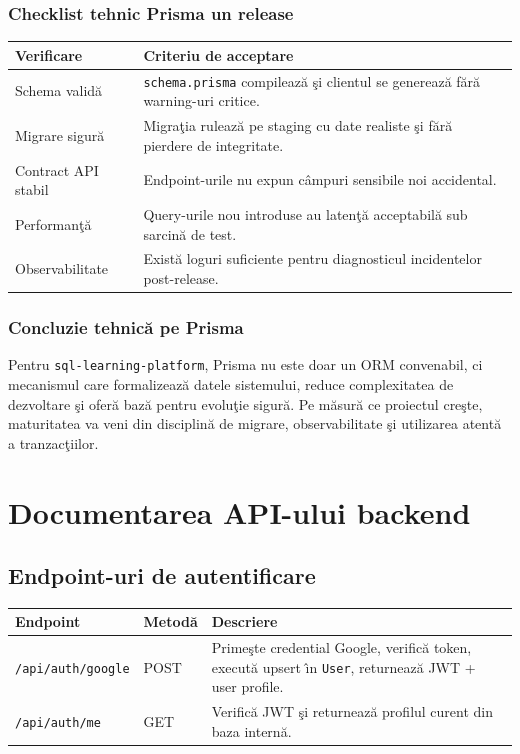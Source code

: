 \documentclass[12pt,onecolumn,draftclsnofoot]{IEEEtran}
\begin{document}
\subsubsection{Checklist tehnic Prisma un release}
\begin{longtable}{p{} p{}}
\toprule
\textbf{Verificare} & \textbf{Criteriu de acceptare} \\
\midrule
Schema valid\u{a} & \texttt{schema.prisma} compileaz\u{a} \c{s}i clientul se genereaz\u{a} f\u{a}r\u{a} warning-uri critice. \\
Migrare sigur\u{a} & Migra\c{t}ia ruleaz\u{a} pe staging cu date realiste \c{s}i f\u{a}r\u{a} pierdere de integritate. \\
Contract API stabil & Endpoint-urile nu expun c\^{a}mpuri sensibile noi accidental. \\
Performan\c{t}\u{a} & Query-urile nou introduse au laten\c{t}\u{a} acceptabil\u{a} sub sarcin\u{a} de test. \\
Observabilitate & Exist\u{a} loguri suficiente pentru diagnosticul incidentelor post-release. \\
\bottomrule
\end{longtable}

\subsubsection{Concluzie tehnic\u{a} pe Prisma}
Pentru \texttt{sql-learning-platform}, Prisma nu este doar un ORM convenabil, ci mecanismul care formalizeaz\u{a} datele sistemului, reduce complexitatea de dezvoltare \c{s}i ofer\u{a} baz\u{a} pentru evolu\c{t}ie sigur\u{a}. Pe m\u{a}sur\u{a} ce proiectul cre\c{s}te, maturitatea va veni din disciplin\u{a} de migrare, observabilitate \c{s}i utilizarea atent\u{a} a tranzac\c{t}iilor.

\section{Documentarea API-ului backend}

\subsection{Endpoint-uri de autentificare}
\begin{longtable}{p{} p{} p{}}
\toprule
\textbf{Endpoint} & \textbf{Metod\u{a}} & \textbf{Descriere} \\
\midrule
\texttt{/api/auth/google} & POST & Prime\c{s}te credential Google, verific\u{a} token, execut\u{a} upsert \^{\i}n \texttt{User}, returneaz\u{a} JWT + user profile. \\
\texttt{/api/auth/me} & GET & Verific\u{a} JWT \c{s}i returneaz\u{a} profilul curent din baza intern\u{a}. \\
\bottomrule
\end{longtable}
\end{document}
